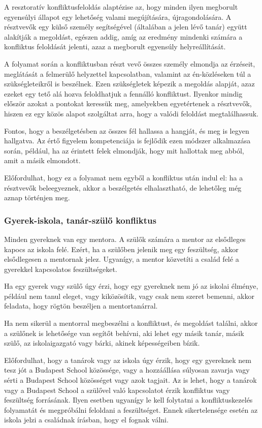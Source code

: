 A resztoratív konfliktusfeloldás alaptézise az, hogy minden ilyen megborult egyensúlyi állapot egy lehetőség valami megújítására, újragondolására. A résztvevők egy külső személy segítségével (általában a jelen lévő tanár) együtt alakítják a megoldást, egészen addig, amíg az eredmény mindenki számára a konfliktus feloldását jelenti, azaz a megborult egyensúly helyreállítását.

A folyamat során a konfliktusban részt vevő összes személy elmondja az érzéseit, meglátását a felmerülő helyzettel kapcsolatban, valamint az én-közléseken túl a szükségleteikről is beszélnek. Ezen szükségletek képezik a megoldás alapját, azaz ezeket egy tető alá hozva feloldhatjuk a fennálló konfliktust. Ilyenkor mindig először azokat a pontokat keressük meg, amelyekben egyetértenek a résztvevők, hiszen ez egy közös alapot szolgáltat arra, hogy a valódi feloldást megtalálhassuk.

Fontos, hogy a beszélgetésben az összes fél hallassa a hangját, és meg is legyen hallgatva. Az értő figyelem kompetenciája is fejlődik ezen módszer alkalmazása során, például, ha az érintett felek elmondják, hogy mit hallottak meg abból, amit a másik elmondott.

Előfordulhat, hogy ez a folyamat nem egyből a konfliktus után indul el: ha a résztvevők beleegyeznek, akkor a beszélgetés elhalasztható, de lehetőleg még aznap történjen meg.

\subsubsection{Gyerek-iskola, tanár-szülő konfliktus}

Minden gyereknek van egy mentora. A szülők számára a mentor az elsődleges kapocs az iskola felé. Ezért, ha a szülőben jelenik meg egy feszültség, akkor elsődlegesen a mentornak jelez. Ugyanígy, a mentor közvetíti a család felé a gyerekkel kapcsolatos feszültségeket.

Ha egy gyerek vagy szülő úgy érzi, hogy egy gyereknek nem jó az iskolai élménye, például nem tanul eleget, vagy kiközösítik, vagy csak nem szeret bemenni, akkor feladata, hogy rögtön beszéljen a mentortanárral.

Ha nem sikerül a mentorral megbeszélni a konfliktust, és megoldást találni, akkor a szülőnek is lehetősége van segítőt behívni, aki lehet egy másik tanár, másik szülő, az iskolaigazgató vagy bárki, akinek képességeiben bízik.

Előfordulhat, hogy a tanárok vagy az iskola úgy érzik, hogy egy gyereknek nem tesz jót a Budapest School közössége, vagy a hozzáállása súlyosan zavarja vagy sérti a Budapest School közösséget vagy azok tagjait. Az is lehet, hogy a tanárok vagy a Budapest School a szülővel való kapcsolatot érzik konfliktus vagy feszültség forrásának. Ilyen esetben ugyanígy le kell folytatni a konfliktuskezelés folyamatát és megpróbálni feloldani a feszültséget. Ennek sikertelensége esetén az iskola jelzi a családnak írásban, hogy el fognak válni.

